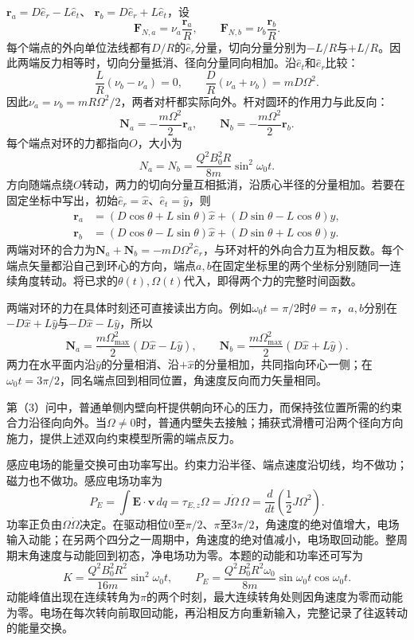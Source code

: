 \documentclass[UTF8,fontset=fandol,a4paper,11pt]{ctexart}
\begin{document}
$\boldsymbol r_a=D\hat e_r-L\hat e_t$、
$\boldsymbol r_b=D\hat e_r+L\hat e_t$，设
\[
\boldsymbol F_{N,a}=\nu_a\frac{\boldsymbol r_a}{R},
\qquad
\boldsymbol F_{N,b}=\nu_b\frac{\boldsymbol r_b}{R}.
\]
每个端点的外向单位法线都有$D/R$的$\hat e_r$分量，切向分量分别为$-L/R$与$+L/R$。因此两端反力相等时，切向分量抵消、径向分量同向相加。沿$\hat e_t$和$\hat e_r$比较：
\[
\frac L R(\nu_b-\nu_a)=0,\qquad
\frac D R(\nu_a+\nu_b)=mD\Omega^2.
\]
因此$\nu_a=\nu_b=mR\Omega^2/2$，两者对杆都实际向外。杆对圆环的作用力与此反向：
\[
\boxed{\boldsymbol N_a=-\frac{m\Omega^2}{2}\boldsymbol r_a,\qquad
\boldsymbol N_b=-\frac{m\Omega^2}{2}\boldsymbol r_b}.
\]
每个端点对环的力都指向$O$，大小为
\[
\boxed{N_a=N_b=\frac{Q^2B_0^2R}{8m}\sin^2\omega_0t}.
\]
方向随端点绕$O$转动，两力的切向分量互相抵消，沿质心半径的分量相加。若要在固定坐标中写出，初始$\hat e_r=\hat x$、$\hat e_t=\hat y$，则
\[
\begin{aligned}
\boldsymbol r_a&=(D\cos\theta+L\sin\theta)\hat x
+(D\sin\theta-L\cos\theta)\hat y,\\
\boldsymbol r_b&=(D\cos\theta-L\sin\theta)\hat x
+(D\sin\theta+L\cos\theta)\hat y.
\end{aligned}
\]
两端对环的合力为$\boldsymbol N_a+\boldsymbol N_b=-mD\Omega^2\hat e_r$，与环对杆的外向合力互为相反数。每个端点矢量都沿自己到环心的方向，端点$a,b$在固定坐标里的两个坐标分别随同一连续角度转动。将已求的$\theta(t),\Omega(t)$代入，即得两个力的完整时间函数。

两端对环的力在具体时刻还可直接读出方向。例如$\omega_0t=\pi/2$时$\theta=\pi$，$a,b$分别在$-D\hat x+L\hat y$与$-D\hat x-L\hat y$，所以
\[
\boldsymbol N_a=\frac{m\Omega_{\max}^2}{2}(D\hat x-L\hat y),\qquad
\boldsymbol N_b=\frac{m\Omega_{\max}^2}{2}(D\hat x+L\hat y).
\]
两力在水平面内沿$\hat y$的分量相消、沿$+\hat x$的分量相加，共同指向环心一侧；在$\omega_0t=3\pi/2$，同名端点回到相同位置，角速度反向而力矢量相同。

第（3）问中，普通单侧内壁向杆提供朝向环心的压力，而保持弦位置所需的约束合力沿径向向外。当$\Omega\ne0$时，普通内壁失去接触；捕获式滑槽可沿两个径向方向施力，提供上述双向约束模型所需的端点反力。

感应电场的能量交换可由功率写出。约束力沿半径、端点速度沿切线，均不做功；磁力也不做功。感应电场功率为
\[
P_E=\int\boldsymbol E\cdot\boldsymbol v\,dq
=\tau_{E,z}\Omega
=J\dot\Omega\,\Omega
=\frac d{dt}\left(\frac12J\Omega^2\right).
\]
功率正负由$\Omega\dot\Omega$决定。在驱动相位$0$至$\pi/2$、$\pi$至$3\pi/2$，角速度的绝对值增大，电场输入动能；在另两个四分之一周期中，角速度的绝对值减小，电场取回动能。整周期末角速度与动能回到初态，净电场功为零。本题的动能和功率还可写为
\[
K=\frac{Q^2B_0^2R^2}{16m}\sin^2\omega_0t,\qquad
P_E=\frac{Q^2B_0^2R^2\omega_0}{8m}\sin\omega_0t\cos\omega_0t.
\]
动能峰值出现在连续转角为$\pi$的两个时刻，最大连续转角处则因角速度为零而动能为零。电场在每次转向前取回动能，再沿相反方向重新输入，完整记录了往返转动的能量交换。
\end{document}
